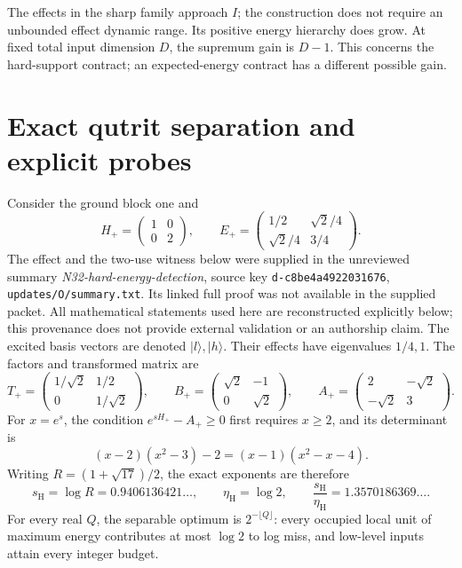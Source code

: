 \documentclass[11pt,a4paper]{article}
\theoremstyle{remark}
\newcommand{\ket}[1]{|#1\rangle}
\newcommand{\ep}{E_+}
\newcommand{\hp}{H_+}
\newcommand{\sh}{s_{\mathrm H}}
\newcommand{\etah}{\eta_{\mathrm H}}
\begin{document}
The effects in the sharp family approach \(I\); the construction does not
require an unbounded effect dynamic range. Its positive energy hierarchy
does grow. At fixed total input dimension \(D\), the supremum gain is
\(D-1\). This concerns the hard-support contract; an expected-energy
contract has a different possible gain.

\section{Exact qutrit separation and explicit probes}
Consider the ground block one and
\begin{equation}\label{eq:qutrit}
 \hp=\begin{pmatrix}1&0\\0&2\end{pmatrix},\qquad
 \ep=\begin{pmatrix}1/2&\sqrt2/4\\\sqrt2/4&3/4\end{pmatrix}.
\end{equation}
The effect and the two-use witness below were supplied in the unreviewed
summary \emph{N32-hard-energy-detection}, source key
\texttt{d-c8be4a4922031676}, \texttt{updates/O/summary.txt}.
Its linked full proof was not available in the supplied packet.
All mathematical statements used here are reconstructed explicitly below;
this provenance does not provide external validation or an authorship claim.
The excited basis vectors are denoted \(\ket l,\ket h\).
Their effects have eigenvalues \(1/4,1\). The factors and transformed
matrix are
\[
 T_+=\begin{pmatrix}1/\sqrt2&1/2\\0&1/\sqrt2\end{pmatrix},\qquad
 B_+=\begin{pmatrix}\sqrt2&-1\\0&\sqrt2\end{pmatrix},\qquad
 A_+=\begin{pmatrix}2&-\sqrt2\\-\sqrt2&3\end{pmatrix}.
\]
For \(x=e^s\), the condition \(e^{s\hp}-A_+\geq0\) first requires
\(x\geq2\), and its determinant is
\[
 (x-2)(x^2-3)-2=(x-1)(x^2-x-4).
\]
Writing \(R=(1+\sqrt{17})/2\), the exact exponents are therefore
\begin{equation}\label{eq:qutritrates}
 \sh=\log R=0.9406136421\ldots,\qquad
 \etah=\log2,\qquad
 \frac{\sh}{\etah}=1.3570186369\ldots .
\end{equation}
For every real \(Q\), the separable optimum is
\(2^{-\lfloor Q\rfloor}\): every occupied local unit of maximum energy
contributes at most \(\log2\) to log miss, and low-level inputs attain
every integer budget.
\end{document}
